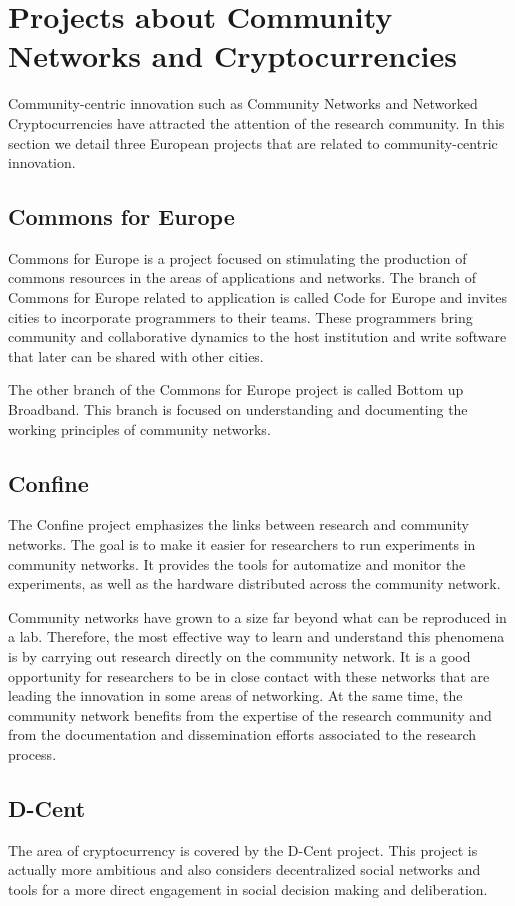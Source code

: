 \documentclass[journal]{IEEEtran}
\begin{document}
\section{Projects about Community Networks and Cryptocurrencies}
\label{sec:projects}

Community-centric innovation such as Community Networks and Networked Cryptocurrencies have attracted the attention of the research community.
In this section we detail three European projects that are related to community-centric innovation.

\subsection{Commons for Europe}
Commons for Europe is a project focused on stimulating the production of commons resources in the areas of applications and networks.
The branch of Commons for Europe related to application is called Code for Europe and invites cities to incorporate programmers to their teams.
These programmers bring community and collaborative dynamics to the host institution and write software that later can be shared with other cities.

The other branch of the Commons for Europe project is called Bottom up Broadband.
This branch is focused on understanding and documenting the working principles of community networks.

\subsection{Confine}
The Confine project \cite{braem2013crc} emphasizes the links between research and community networks.
The goal is to make it easier for researchers to run experiments in community networks.
It provides the tools for automatize and monitor the experiments, as well as the hardware distributed across the community network.

Community networks have grown to a size far beyond what can be reproduced in a lab.
Therefore, the most effective way to learn and understand this phenomena is by carrying out research directly on the community network.
It is a good opportunity for researchers to be in close contact with these networks that are leading the innovation in some areas of networking.
At the same time, the community network benefits from the expertise of the research community and from the documentation and dissemination efforts associated to the research process.

\subsection{D-Cent}
The area of cryptocurrency is covered by the D-Cent project.
This project is actually more ambitious and also considers decentralized social networks and tools for a more direct engagement in social decision making and deliberation.
\end{document}
